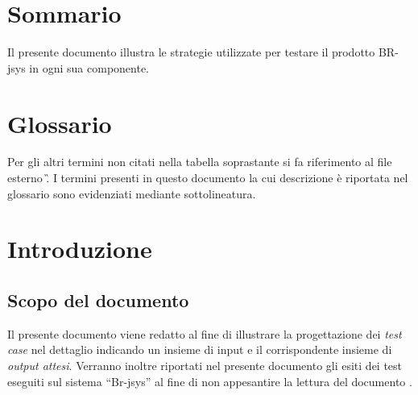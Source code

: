 \chapter*{Sommario}
Il presente documento illustra le strategie utilizzate per testare il prodotto BR-jsys in ogni sua componente.

\chapter*{Glossario}
Per gli altri termini non citati nella tabella soprastante si fa riferimento al file esterno \G. I termini presenti in questo documento la cui descrizione \`e riportata nel glossario sono evidenziati mediante sottolineatura.

\chapter{Introduzione}

\section{Scopo del documento}
Il presente documento viene redatto al fine di illustrare la progettazione dei \textit{test case} nel dettaglio indicando un insieme di input e il corrispondente insieme di \textit{output attesi}. Verranno inoltre riportati nel presente documento gli esiti dei test eseguiti sul sistema ``Br-jsys'' al fine di non appesantire la lettura del documento \PdQ .

